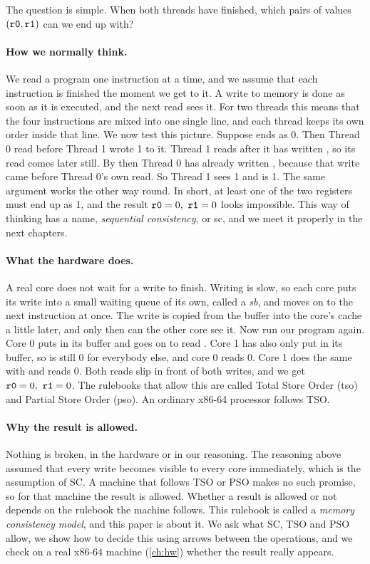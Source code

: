 The question is simple. When both threads have finished, which pairs of values $(\texttt{r0}, \texttt{r1})$ can we end up with?

\paragraph{How we normally think.} We read a program one instruction at a time, and we assume that each instruction is finished the moment we get to it. A write to memory is done as soon as it is executed, and the next read sees it. For two threads this means that the four instructions are mixed into one single line, and each thread keeps its own order inside that line. We now test this picture. Suppose  ends as 0. Then Thread 0 read  before Thread 1 wrote 1 to it. Thread 1 reads  after it has written , so its read comes later still. By then Thread 0 has already written , because that write came before Thread 0's own read. So Thread 1 sees 1 and  is 1. The same argument works the other way round. In short, at least one of the two registers must end up as 1, and the result $\texttt{r0} = 0,\ \texttt{r1} = 0$ looks impossible. This way of thinking has a name, \emph{sequential consistency}, or \gls{sc}, and we meet it properly in the next chapters.

\paragraph{What the hardware does.} A real core does not wait for a write to finish. Writing is slow, so each core puts its write into a small waiting queue of its own, called a \emph{\gls{sb}}, and moves on to the next instruction at once. The write is copied from the buffer into the core's cache a little later, and only then can the other core see it. Now run our program again. Core 0 puts  in its buffer and goes on to read . Core 1 has also only put  in its buffer, so  is still 0 for everybody else, and core 0 reads 0. Core 1 does the same with  and reads 0. Both reads slip in front of both writes, and we get $\texttt{r0} = 0,\ \texttt{r1} = 0$. The rulebooks that allow this are called Total Store Order (\gls{tso}) and Partial Store Order (\gls{pso}). An ordinary x86-64 processor follows TSO.

\paragraph{Why the result is allowed.} Nothing is broken, in the hardware or in our reasoning. The reasoning above assumed that every write becomes visible to every core immediately, which is the assumption of SC. A machine that follows TSO or PSO makes no such promise, so for that machine the result is allowed. Whether a result is allowed or not depends on the rulebook the machine follows. This rulebook is called a \emph{memory consistency model}, and this paper is about it. We ask what SC, TSO and PSO allow, we show how to decide this using arrows between the operations, and we check on a real x86-64 machine (\cref{ch:hw}) whether the result really appears.


